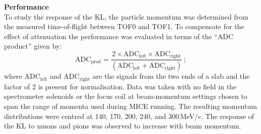 \noindent\textbf{Performance} \\
\noindent
To study the response of the KL, the particle momentum was determined from the
measured time-of-flight between TOF0 and TOF1.
To compensate for the effect of attenuation the performance was
evaluated in terms of the ``ADC product'' given by:
\begin{equation}
  \text{ADC}_{\text{prod}} = \frac{2 \times
    \text{ADC}_{\text{left}} \times \text{ADC}_{\text{right}}}{
    (\text{ADC}_{\text{left}} + \text{ADC}_{\text{right}})}\,;
\end{equation}
where ADC$_{\text{left}}$ and ADC$_{\text{right}}$ are the signals
from the two ends of a slab and the factor of 2 is present for
normalisation.
Data was taken with no field in the spectrometer solenoids or the
focus coil at beam-momentum settings chosen to span the range of
momenta used during MICE running.
The resulting momentum distributions were centred at 140, 170,
200, 240, and 300\,MeV/$c$.
The response of the KL to muons and pions was observed to increase with
beam momentum.
  
